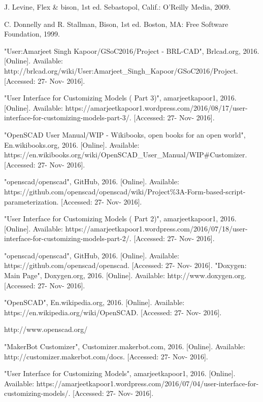  
\begin{thebibliography}{22}

\bibitem{} J. Levine, Flex \& bison, 1st ed. Sebastopol, Calif.: O'Reilly Media, 2009.

\bibitem{} C. Donnelly and R. Stallman, Bison, 1st ed. Boston, MA: Free Software Foundation, 1999.

\bibitem{} "User:Amarjeet Singh Kapoor/GSoC2016/Project - BRL-CAD", Brlcad.org, 2016. [Online]. Available: http://brlcad.org/wiki/User:Amarjeet\_Singh\_Kapoor/GSoC2016/Project. [Accessed: 27- Nov- 2016].

\bibitem{} "User Interface for Customizing Models ( Part 3)", amarjeetkapoor1, 2016. [Online]. Available: https://amarjeetkapoor1.wordpress.com/2016/08/17/user-interface-for-customizing-models-part-3/. [Accessed: 27- Nov- 2016].


\bibitem{} "OpenSCAD User Manual/WIP - Wikibooks, open books for an open world", En.wikibooks.org, 2016. [Online]. Available: https://en.wikibooks.org/wiki/OpenSCAD\_User\_Manual/WIP\#Customizer. [Accessed: 27- Nov- 2016].

\bibitem{} "openscad/openscad", GitHub, 2016. [Online]. Available: https://github.com/openscad/openscad/wiki/Project\%3A-Form-based-script-parameterization. [Accessed: 27- Nov- 2016].

\bibitem{} "User Interface for Customizing Models ( Part 2)", amarjeetkapoor1, 2016. [Online]. Available: https://amarjeetkapoor1.wordpress.com/2016/07/18/user-interface-for-customizing-models-part-2/. [Accessed: 27- Nov- 2016].

\bibitem{} "openscad/openscad", GitHub, 2016. [Online]. Available: https://github.com/openscad/openscad. [Accessed: 27- Nov- 2016].
\bibitem{} "Doxygen: Main Page", Doxygen.org, 2016. [Online]. Available: http://www.doxygen.org. [Accessed: 27- Nov- 2016].

\bibitem{} "OpenSCAD", En.wikipedia.org, 2016. [Online]. Available: https://en.wikipedia.org/wiki/OpenSCAD. [Accessed: 27- Nov- 2016].

\bibitem{} http://www.openscad.org/

\bibitem{} "MakerBot Customizer", Customizer.makerbot.com, 2016. [Online]. Available: http://customizer.makerbot.com/docs. [Accessed: 27- Nov- 2016].

\bibitem{} "User Interface for Customizing Models", amarjeetkapoor1, 2016. [Online]. Available: https://amarjeetkapoor1.wordpress.com/2016/07/04/user-interface-for-customizing-models/. [Accessed: 27- Nov- 2016].


\end{thebibliography}
